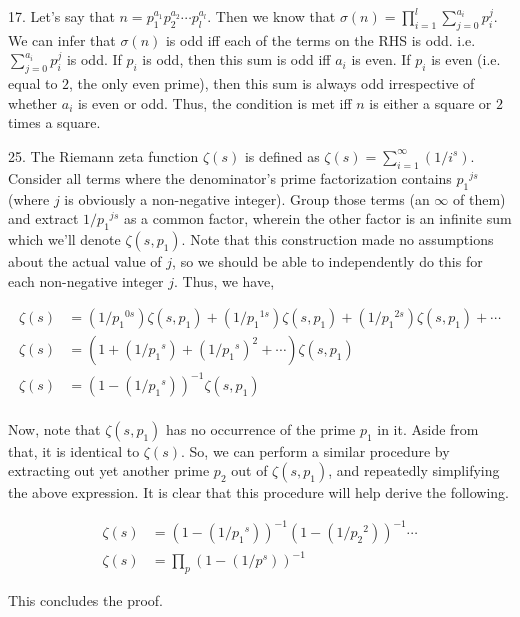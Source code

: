 \documentclass{article}
\begin{document}
17. Let's say that $n = p_1^{a_1} p_2^{a_2} \cdots p_l^{a_l}$. Then we know that $\sigma(n) = \prod_{i = 1}^l \sum_{j = 0}^{a_i} p_i^j$. We can infer that $\sigma(n)$ is odd iff each of the terms on the RHS is odd. i.e. $\sum_{j = 0}^{a_i} p_i^j$ is odd. If $p_i$ is odd, then this sum is odd iff $a_i$ is even. If $p_i$ is even (i.e. equal to $2$, the only even prime), then this sum is always odd irrespective of whether $a_i$ is even or odd. Thus, the condition is met iff $n$ is either a square or $2$ times a square. 

25. The Riemann zeta function $\zeta(s)$ is defined as $\zeta(s) = \sum_{i = 1}^\infty (1 / i^s)$. Consider all terms where the denominator's prime factorization contains ${p_1}^{js}$ (where $j$ is obviously a non-negative integer). Group those terms (an $\infty$ of them) and extract $1 / {p_1}^{js}$ as a common factor, wherein the other factor is an infinite sum which we'll denote $\zeta(s, p_1)$. Note that this construction made no assumptions about the actual value of $j$, so we should be able to independently do this for each non-negative integer $j$. Thus, we have,

\begin{align*}
    \zeta(s) &= (1 / {p_1}^{0s}) \zeta(s, p_1) + (1 / {p_1}^{1s}) \zeta(s, p_1) + (1 / {p_1}^{2s}) \zeta(s, p_1) + \cdots \\
    \zeta(s) &= (1 + (1 / {p_1}^s) + (1 / {p_1}^s)^2 + \cdots) \zeta(s, p_1) \\
    \zeta(s) &= (1 - (1 / {p_1}^s))^{-1} \zeta(s, p_1) \\
\end{align*}

Now, note that $\zeta(s, p_1)$ has no occurrence of the prime $p_1$ in it. Aside from that, it is identical to $\zeta(s)$. So, we can perform a similar procedure by extracting out yet another prime $p_2$ out of $\zeta(s, p_1)$, and repeatedly simplifying the above expression. It is clear that this procedure will help derive the following.

\begin{align*}
    \zeta(s) &= (1 - (1 / {p_1}^s))^{-1} (1 - (1 / {p_2}^2))^{-1} \cdots \\
    \zeta(s) &= \prod_p (1 - (1 / p^s))^{-1}
\end{align*}

This concludes the proof.
\end{document}
